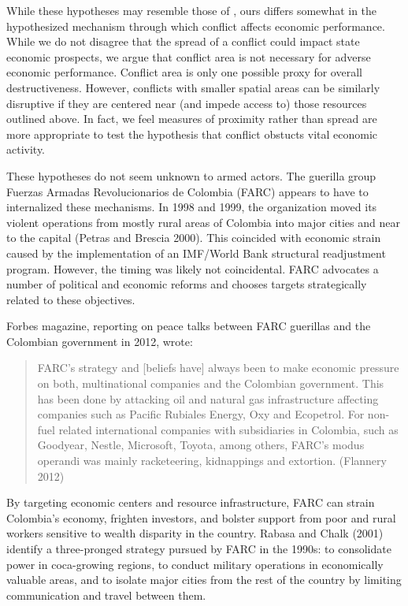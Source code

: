 While these hypotheses may resemble those of \cite{imai:weinstein:2000}, ours differs somewhat in the hypothesized mechanism through which conflict affects economic performance.  While we do not disagree that the spread of a conflict could impact state economic prospects, we argue that conflict area is not necessary for adverse economic performance.  Conflict area is only one possible proxy for overall destructiveness.  However, conflicts with smaller spatial areas can be similarly disruptive if they are centered near (and impede access to) those resources outlined above.  In fact, we feel measures of proximity rather than spread are more appropriate to test the hypothesis that conflict obstucts vital economic activity.

These hypotheses do not seem unknown to armed actors.  The guerilla group Fuerzas Armadas Revolucionarios de Colombia (FARC) appears to have to internalized these mechanisms.  In 1998 and 1999, the organization moved its violent operations from mostly rural areas of Colombia into major cities and near to the capital (Petras and Brescia 2000).  This coincided with economic strain caused by the implementation of an IMF/World Bank structural readjustment program.  However, the timing was likely not coincidental.  FARC advocates a number of political and economic reforms and chooses targets strategically related to these objectives.

Forbes magazine, reporting on peace talks between FARC guerillas and the Colombian government in 2012, wrote: 
\begin{quote}FARC's strategy and [beliefs have] always been to make economic pressure on both, multinational companies and the Colombian government. This has been done by attacking oil and natural gas infrastructure affecting companies such as Pacific Rubiales Energy, Oxy and Ecopetrol. For non-fuel related international companies with subsidiaries in Colombia, such as Goodyear, Nestle, Microsoft, Toyota, among others, FARC’s modus operandi was mainly racketeering, kidnappings and extortion. (Flannery 2012)\end{quote}
By targeting economic centers and resource infrastructure, FARC can strain Colombia's economy, frighten investors, and bolster support from poor and rural workers sensitive to wealth disparity in the country.  Rabasa and Chalk (2001) identify a three-pronged strategy pursued by FARC in the 1990s: to consolidate power in coca-growing regions, to conduct military operations in economically valuable areas, and to isolate major cities from the rest of the country by limiting communication and travel between them.    

